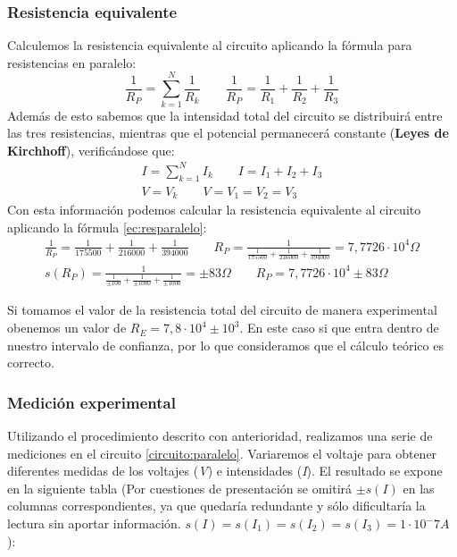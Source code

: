 \documentclass[12pt, a4paper, titlepage]{article}
\begin{document}
  \subsubsection{Resistencia equivalente}
  \label{sec:reseqparalelo}

  Calculemos la resistencia equivalente al circuito aplicando la fórmula para resistencias en paralelo:
  \begin{equation}
      \label{ec:resparalelo}
      \frac{1}{R_P} = \sum^N_{k=1} \frac{1}{R_k} \qquad \frac{1}{R_P} = \frac{1}{R_1} + \frac{1}{R_2} + \frac{1}{R_3}
  \end{equation}
  Además de esto sabemos que la intensidad total del circuito se distribuirá entre las tres resistencias, mientras que el potencial permanecerá constante (\textbf{Leyes de Kirchhoff}), verificándose que:
  \begin{gather}
      I = \sum^N_{k=1} I_k \qquad I = I_1 + I_2 + I_3 \nonumber \\
      V = V_k \qquad V = V_1 = V_2 = V_3 \label{ec:kripar}
  \end{gather}
  Con esta información podemos calcular la resistencia equivalente al circuito aplicando la fórmula \ref{ec:resparalelo}:
  \begin{gather}
      \frac{1}{R_P} = \frac{1}{175500} + \frac{1}{216000} + \frac{1}{394000} \qquad R_P = \frac{1}{\frac{1}{175500} + \frac{1}{216000} + \frac{1}{394000}} = 7,7726 \cdot 10^4 \Omega \nonumber \\
      s(R_P) = \frac{1}{\frac{1}{\pm100} + \frac{1}{\pm1000} + \frac{1}{\pm1000}} = \pm83 \Omega \qquad R_P = 7,7726 \cdot 10^4 \pm 83 \Omega \nonumber
  \end{gather}

  Si tomamos el valor de la resistencia total del circuito de manera experimental obenemos un valor de $R_E = 7,8 \cdot 10^4 \pm 10^3$. En este caso si que entra dentro de nuestro intervalo de confianza, por lo que consideramos que el cálculo teórico es correcto.

  \subsubsection{Medición experimental}

  Utilizando el procedimiento descrito con anterioridad, realizamos una serie de mediciones en el circuito \ref{circuito:paralelo}. Variaremos el voltaje para obtener diferentes medidas de los voltajes (\textit{V}) e intensidades (\textit{I}). El resultado se expone en la siguiente tabla (Por cuestiones de presentación se omitirá $\pm s(I)$ en las columnas correspondientes, ya que quedaría redundante y sólo dificultaría la lectura sin aportar información. $s(I) = s(I_1) = s(I_2) = s(I_3) = 1 \cdot 10^-7 A$):
\end{document}
